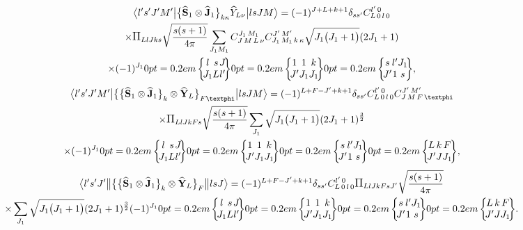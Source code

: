 \begin{multline}
\braOket{ l^{\prime} s^{\prime} J^{\prime} M^{\prime}}{\bigl\{\widehat{\vect{S}}_{1} \otimes \widehat{\vect{J}}_{1}\bigr\}_{k \kappa} \widehat{Y}_{L \nu}}{l s J M}=(-1)^{J+L+k+1} \delta_{s s^{\prime}} 
\clebsch{L}{0}{l}{0}{l^{\prime}}{0} \\
 \times \Fact{L l J k s}\sqrt{\frac{s(s+1)}{4 \pi}} \sum_{J_{1} M_{1}} 
\clebsch{J}{M}{L}{\nu}{J_{1}}{M_{1}} 
\clebsch{J_{1}}{M_{1}}{k}{\kappa}{J^{\prime}}{M^{\prime}} \sqrt{J_{1}\bigl(J_{1}+1\bigr)}(2 J_{1}+1) \\
 \times(-1)^{J_{1}}
\sixj{l}{s}{J}{J_{1}}{L}{l^{\prime}}
\sixj{1}{1}{k}{J^{\prime}}{J_{1}}{J_{1}}
\sixj{s}{l^{\prime}}{J_{1}}{J^{\prime}}{1}{s},  \label{eq:13:2:146}
\end{multline}
\begin{multline}
\braOket{ l^{\prime} s^{\prime} J^{\prime} M^{\prime}}{\bigl\{\bigl\{\widehat{\vect{S}}_{1} \otimes \widehat{\vect{J}}_{1}\bigr\}_{k} \otimes \widehat{\vect{Y}}_{L}\bigr\}_{F \varphi}}{l s J M}=(-1)^{L+F-J^{\prime}+k+1} \delta_{s s^{\prime}} 
\clebsch{L}{0}{l}{0}{l^{\prime}}{0} 
\clebsch{J}{M}{F}{\varphi}{J^{\prime}}{M^{\prime}} \\
 \times \Fact{L l J k F s}\sqrt{\frac{s(s+1)}{4 \pi}} \sum_{J_{1}} \sqrt{J_{1}\bigl(J_{1}+1\bigr)}(2 J_{1}+1)^{\frac{3}{2}} \\
\times(-1)^{J_{1}}
\sixj{l}{s}{J}{J_{1}}{L}{l^{\prime}}
\sixj{1}{1}{k}{J^{\prime}}{J_{1}}{J_{1}}
\sixj{s}{l^{\prime}}{J_{1}}{J^{\prime}}{1}{s}
\sixj{L}{k}{F}{J^{\prime}}{J}{J_{1}} , \label{eq:13:2:147}
\end{multline}
\begin{multline*}
\braOketred{ l^{\prime} s^{\prime} J^{\prime}}{\bigl\{\bigl\{\widehat{\vect{S}}_{1} \otimes \widehat{\vect{J}}_{1}\bigr\}_{k} \otimes \widehat{\vect{Y}}_{L}\bigr\}_{F}}{l s J}=(-1)^{L+F-J^{\prime}+k+1} \delta_{s s^{\prime}}
\clebsch{L}{0}{l}{0}{l^{\prime}}{0}
\Fact{L l J k F s J^{\prime}}\sqrt{\frac{s(s+1)}{4 \pi}} \\
\times \sum_{J_{1}} \sqrt{J_{1}\bigl(J_{1}+1\bigr)}(2 J_{1}+1)^{\frac{3}{2}}(-1)^{J_{1}}
\sixj{l}{s}{J}{J_{1}}{L}{l^{\prime}}
\sixj{1}{1}{k}{J^{\prime}}{J_{1}}{J_{1}}
\sixj{s}{l^{\prime}}{J_{1}}{J^{\prime}}{1}{s}
\sixj{L}{k}{F}{J^{\prime}}{J}{J_{1}}.
\end{multline*}

